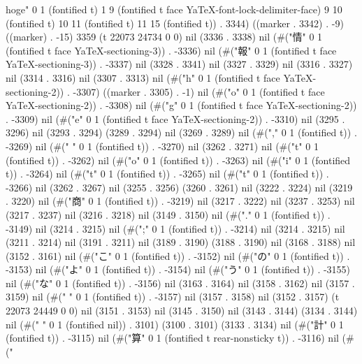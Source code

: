 hoge" 0 1 (fontified t) 1 9 (fontified t face YaTeX-font-lock-delimiter-face) 9 10 (fontified t) 10 11 (fontified t) 11 15 (fontified t)) . 3344) ((marker . 3342) . -9) ((marker) . -15) 3359 (t 22073 24734 0 0) nil (3336 . 3338) nil (#("情" 0 1 (fontified t face YaTeX-sectioning-3)) . -3336) nil (#("報" 0 1 (fontified t face YaTeX-sectioning-3)) . -3337) nil (3328 . 3341) nil (3327 . 3329) nil (3316 . 3327) nil (3314 . 3316) nil (3307 . 3313) nil (#("h" 0 1 (fontified t face YaTeX-sectioning-2)) . -3307) ((marker . 3305) . -1) nil (#("o" 0 1 (fontified t face YaTeX-sectioning-2)) . -3308) nil (#("g" 0 1 (fontified t face YaTeX-sectioning-2)) . -3309) nil (#("e" 0 1 (fontified t face YaTeX-sectioning-2)) . -3310) nil (3295 . 3296) nil (3293 . 3294) (3289 . 3294) nil (3269 . 3289) nil (#("," 0 1 (fontified t)) . -3269) nil (#(" " 0 1 (fontified t)) . -3270) nil (3262 . 3271) nil (#("t" 0 1 (fontified t)) . -3262) nil (#("o" 0 1 (fontified t)) . -3263) nil (#("i" 0 1 (fontified t)) . -3264) nil (#("t" 0 1 (fontified t)) . -3265) nil (#("t" 0 1 (fontified t)) . -3266) nil (3262 . 3267) nil (3255 . 3256) (3260 . 3261) nil (3222 . 3224) nil (3219 . 3220) nil (#("商" 0 1 (fontified t)) . -3219) nil (3217 . 3222) nil (3237 . 3253) nil (3217 . 3237) nil (3216 . 3218) nil (3149 . 3150) nil (#("." 0 1 (fontified t)) . -3149) nil (3214 . 3215) nil (#(";" 0 1 (fontified t)) . -3214) nil (3214 . 3215) nil (3211 . 3214) nil (3191 . 3211) nil (3189 . 3190) (3188 . 3190) nil (3168 . 3188) nil (3152 . 3161) nil (#("こ" 0 1 (fontified t)) . -3152) nil (#("の" 0 1 (fontified t)) . -3153) nil (#("よ" 0 1 (fontified t)) . -3154) nil (#("う" 0 1 (fontified t)) . -3155) nil (#("な" 0 1 (fontified t)) . -3156) nil (3163 . 3164) nil (3158 . 3162) nil (3157 . 3159) nil (#("
" 0 1 (fontified t)) . -3157) nil (3157 . 3158) nil (3152 . 3157) (t 22073 24449 0 0) nil (3151 . 3153) nil (3145 . 3150) nil (3143 . 3144) (3134 . 3144) nil (#(" " 0 1 (fontified nil)) . 3101) (3100 . 3101) (3133 . 3134) nil (#("計" 0 1 (fontified t)) . -3115) nil (#("算" 0 1 (fontified t rear-nonsticky t)) . -3116) nil (#("
